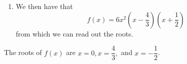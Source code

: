 \documentclass[addpoints,12pt]{exam}
\begin{document}
\begin{questions}
\begin{solution}
\begin{enumerate}
        \item We then have that
          \begin{equation}
            f(x) = 6x^2(x - \dfrac{4}{3})(x + \dfrac{1}{2})
          \end{equation}
          from which we can read out the roots.
      \end{enumerate}

      The roots of $f(x)$ are $x = 0, x = \dfrac{4}{3},$ and $x = -\dfrac{1}{2}$.

    \end{solution}
  \end{questions}
\end{document}
